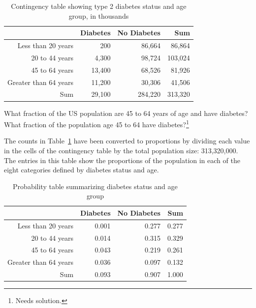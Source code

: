 \begin{table}[ht]
	\centering
	\begin{tabular}{rrrr}
		\hline
		& Diabetes & No Diabetes & Sum \\ 
		\hline
		Less than 20 years & 200 & 86,664 & 86,864 \\ 
		20 to 44 years & 4,300 & 98,724 & 103,024 \\ 
		45 to 64 years & 13,400 & 68,526 & 81,926 \\ 
		Greater than 64 years & 11,200 & 30,306 & 41,506 \\ 
		Sum & 29,100 & 284,220 & 313,320 \\ 
		\hline
	\end{tabular}
	\caption{Contingency table showing type 2 diabetes status and age group, in thousands}
	\label{DiabetesAgeContTable}
\end{table}

\begin{exercise} \label{DiabetesAge20to44}

What fraction of the US population are 45 to 64 years of age and have diabetes?  What fraction of the population age 45 to 64 have diabetes?\footnote{Needs solution.}

\end{exercise}

The counts in Table~\ref{DiabetesAgeContTable} have been converted to proportions by dividing each value in the cells of the contingency table by the total population size: 313,320,000. The entries in this table show the proportions of the population in each of the eight categories defined by diabetes status and age. 


\begin{table}[ht]
	\centering
	\begin{tabular}{rrrr}
		\hline
		& Diabetes & No Diabetes & Sum \\ 
		\hline
		Less than 20 years & 0.001 & 0.277 & 0.277 \\ 
		20 to 44 years & 0.014 & 0.315 & 0.329 \\ 
		45 to 64 years & 0.043 & 0.219 & 0.261 \\ 
		Greater than 64 years & 0.036 & 0.097 & 0.132 \\ 
		Sum & 0.093 & 0.907 & 1.000 \\ 
		\hline
	\end{tabular}
	\caption{Probability table summarizing diabetes status and age group}
	\label{DiabetesAgeProbTable}
\end{table}

